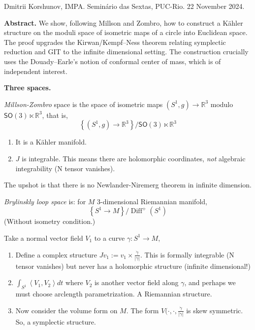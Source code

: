 \noindent
Dmitrii Korshunov, IMPA. Seminário das
Sextas, PUC-Rio. 22 November 2024.

\medskip\noindent
{\bf Abstract.}
We show, following Millson and Zombro, how to
construct a Kähler structure on the moduli
space of isometric maps of a circle into
Euclidean space. The proof upgrades the
Kirwan/Kempf--Ness theorem relating
symplectic reduction and GIT to the infinite
dimensional setting. The construction
crucially uses the Douady--Earle's notion of
conformal center of mass, which is of
independent interest.

\medskip\noindent
{\bf Three spaces.}

\begin{definition}
\label{definition-korshunov-millson-zombro}
\textit{Millson-Zombro} space is the space of
isometric maps $(S^1,g)\to\mathbb{R}^3$
modulo $\mathsf{SO}(3)\ltimes \mathbb{R}^3$,
that is,
$$\left\{ (S^1,g)\to\mathbb{R}^3
\right\}\Big/\mathsf{SO}(3)\ltimes
\mathbb{R}^3$$
\end{definition}
\begin{enumerate}
\item It is a Kähler manifold.
\item $J$ is integrable. This means there are
holomorphic coordinates, \textit{not}
algebraic integrability (N tensor vanishes).
\end{enumerate}
The upshot is that there is no
Newlander-Niremerg theorem in infinite
dimension.

\begin{definition}
\label{definition-korshunov-brylinski}
\textit{Brylinskly loop space} is: for $M$
3-dimensional Riemannian manifold,
$$\left\{ S^1\to M \right\}
\Big/\operatorname{Diff}^+(S^1)$$
(Without isometry condition.)
\end{definition}
Take a normal vector field $V_1$ to a curve
$\gamma:S^1\to M$,
\begin{enumerate}
\item Define a complex structure $J v_1:=v_1
\times \frac{\dot \gamma}{|\dot \gamma|}$.
This is formally integrable (N tensor
vanishes) but never has a holomorphic
structure (infinite dimensional!)
\item $\int_{S^1}\left\langle{} V_1,V_2
\right\rangle{} dt$ where $V_2$ is another
vector field along $\gamma$, and perhaps we
must choose arclength parametrization. A
Riemannian structure.
\item Now consider the volume form on $M$.
The form
$V(\cdot,\cdot,
\frac{\dot\gamma}{|\dot\gamma|}$
is skew symmetric. So, a symplectic
structure.
\end{enumerate}

